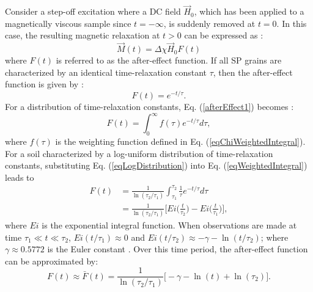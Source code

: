 \documentclass[onecolumn]{IEEEtran} %
\begin{document}
Consider a step-off excitation where a DC field $\vec H_0$, which has been applied to a magnetically viscous sample since $t = -\infty$, is suddenly removed at $t=0$. In this case, the resulting magnetic relaxation at $t >0$ can be expressed as \cite{Neel1949,Billings2003,Pasion2007}:
\begin{equation}
\vec M(t) = \Delta \chi \vec H_0 F(t)
\label{eqMagSte}
\end{equation}
where $F(t)$ is referred to as the after-effect function. If all SP grains are characterized by an identical time-relaxation constant $\tau$, then the after-effect function is given by \cite{Neel1949,Billings2003,Pasion2007}:
\begin{equation}
F (t) = e^{-t/\tau}. \label{afterEffect1}
\end{equation}
For a distribution of time-relaxation constants, Eq. (\ref{afterEffect1}) becomes \cite{Neel1949,Mullins1973,Billings2003,Pasion2007}:
\begin{equation}
\label{eqWeightedIntegral} F(t) = \int^{\infty}_0 f(\tau)
e^{-t/\tau} d \tau,
\end{equation}
where $f(\tau)$ is the weighting function defined in Eq. (\ref{eqChiWeightedIntegral}). For a soil characterized by a log-uniform distribution of time-relaxation constants, substituting Eq. (\ref{eqLogDistribution}) into Eq. (\ref{eqWeightedIntegral}) leads to
\begin{equation}
\begin{split}
F(t) &= \frac{1}{\ln(\tau_2/\tau_1)} \int^{\tau_2}_{\tau_1} \frac{1}{\tau} e^{-t/\tau} d \tau \\
& = \frac{1}{\ln(\tau_2/\tau_1)} \Bigg [ Ei \Big ( \frac{t}{\tau_2} \Big ) - Ei \Big ( \frac{t}{\tau_1} \Big ) \Bigg ],
\end{split}
\label{eqIntDist}
\end{equation}
where $Ei$ is the  exponential integral function. When observations are made at time $\tau_1 \ll t \ll \tau_2$, $Ei (t/\tau_1) \approx
0$ and $Ei (t/\tau_2) \approx -\gamma - \ln(t/\tau_2)$; where $\gamma \approx 0.5772$ is the Euler constant \cite{Pasion2007}. Over this time period, the after-effect function can be approximated by:
\begin{equation}
\label{eqAfterEffectB} F(t) \approx \bar F(t) = \frac{1}{\ln(\tau_2/\tau_1)} \big [ - \gamma - \ln(t) + \ln(\tau_2) \big ].
\end{equation}
\end{document}
